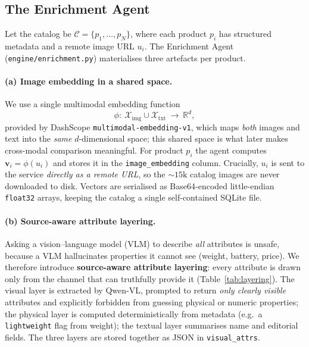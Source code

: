 \subsection{The Enrichment Agent}
\label{sec:enrichment}

Let the catalog be $\mathcal{C}=\{p_1,\dots,p_N\}$, where each product $p_i$ has
structured metadata and a remote image URL $u_i$. The Enrichment Agent
(\texttt{engine/enrichment.py}) materialises three artefacts per product.

\paragraph{(a) Image embedding in a shared space.}
We use a single multimodal embedding function
\begin{equation}
  \phi:\ \mathcal{X}_{\mathrm{img}}\cup\mathcal{X}_{\mathrm{txt}}\ \longrightarrow\ \mathbb{R}^{d},
  \label{eq:phi}
\end{equation}
provided by DashScope \texttt{multimodal-embedding-v1}, which maps \emph{both}
images and text into the \emph{same} $d$-dimensional space; this shared space is
what later makes cross-modal comparison meaningful. For product $p_i$ the agent
computes $\mathbf{v}_i=\phi(u_i)$ and stores it in the \texttt{image\_embedding}
column. Crucially, $u_i$ is sent to the service \emph{directly as a remote URL},
so the $\sim\!15\mathrm{k}$ catalog images are never downloaded to disk. Vectors
are serialised as Base64-encoded little-endian \texttt{float32} arrays, keeping
the catalog a single self-contained SQLite file.

\paragraph{(b) Source-aware attribute layering.}
Asking a vision--language model (VLM) to describe \emph{all} attributes is
unsafe, because a VLM hallucinates properties it cannot see (weight, battery,
price). We therefore introduce \textbf{source-aware attribute layering}: every
attribute is drawn only from the channel that can truthfully provide it
(Table~\ref{tab:layering}). The visual layer is extracted by Qwen-VL, prompted to
return \emph{only clearly visible} attributes and explicitly forbidden from
guessing physical or numeric properties; the physical layer is computed
deterministically from metadata (e.g.\ a \texttt{lightweight} flag from weight);
the textual layer summarises name and editorial fields. The three layers are
stored together as JSON in \texttt{visual\_attrs}.

